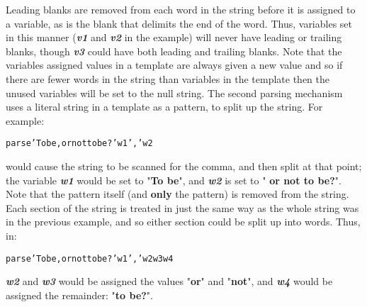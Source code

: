 Leading blanks are removed from each word in the string before it is
assigned to a variable, as is the blank that delimits the end of the
word.
Thus, variables set in this manner (\textbf{\emph{v1}}
and \textbf{\emph{v2}} in the example) will never have leading or
trailing blanks, though \textbf{\emph{v3}} could have both leading
and trailing blanks.
 Note that the variables assigned values in a template are always
given a new value and so if there are fewer words in the string than
variables in the template then the unused variables will be set to the
null string.
 The second parsing mechanism uses a literal string in a template as a
pattern, to split up the string.
For example:
\begin{alltt}
parse 'To be, or not to be?' w1 ',' w2
\end{alltt}
would cause the string to be scanned for the comma, and then split
at that point; the variable \textbf{\emph{w1}} would be set
to "\textbf{To be}", and \textbf{\emph{w2}} is set to
"\textbf{ or not to be?}".
Note that the pattern itself (and \textbf{only} the pattern) is
removed from the string.
Each section of the string is treated in just the same way as the whole
string was in the previous example, and so either section could be split
up into words.
 Thus, in:
\begin{alltt}
parse 'To be, or not to be?' w1 ',' w2 w3 w4
\end{alltt}
\textbf{\emph{w2}} and \textbf{\emph{w3}} would be
assigned the values "\textbf{or}" and "\textbf{not}",
and \textbf{\emph{w4}} would be assigned the remainder:
"\textbf{to be?}".
 
